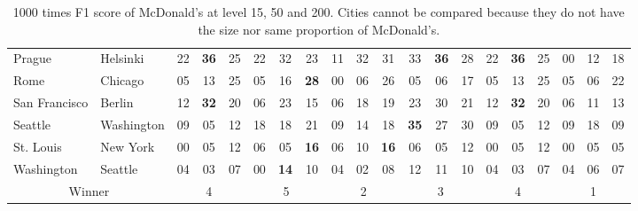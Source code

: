 \documentclass[svgnames,a4paper,final,notitlepage,10pt]{article}
\newcommand{\cbest}[1]{\textbf{#1}}
\newcommand{\notbest}[1]{\textcolor{light-gray}{#1}}
\begin{document}
\begin{table}[ht]
\begin{tabular}{llccc|ccc|ccc|ccc|ccc|ccc}
Prague & Helsinki & \notbest{22} & \cbest{36} & \notbest{25} & \notbest{22} & 32 & \notbest{23} & \notbest{11} & 32 & \notbest{31} & \notbest{33} & \cbest{36} & \notbest{28} & \notbest{22} & \cbest{36} & \notbest{25} & \notbest{00} & \notbest{12} & 18 \\
Rome & Chicago & \notbest{05} & \notbest{13} & 25 & \notbest{05} & \notbest{16} & \cbest{28} & \notbest{00} & \notbest{06} & 26 & \notbest{05} & \notbest{06} & 17 & \notbest{05} & \notbest{13} & 25 & \notbest{05} & \notbest{06} & 22 \\
San Francisco & Berlin & \notbest{12} & \cbest{32} & \notbest{20} & \notbest{06} & 23 & \notbest{15} & \notbest{06} & \notbest{18} & 19 & \notbest{23} & 30 & \notbest{21} & \notbest{12} & \cbest{32} & \notbest{20} & \notbest{06} & \notbest{11} & 13 \\
Seattle & Washington & \notbest{09} & \notbest{05} & 12 & \notbest{18} & \notbest{18} & 21 & \notbest{09} & \notbest{14} & 18 & \cbest{35} & \notbest{27} & \notbest{30} & \notbest{09} & \notbest{05} & 12 & \notbest{09} & 18 & \notbest{09} \\
St. Louis & New York & \notbest{00} & \notbest{05} & 12 & \notbest{06} & \notbest{05} & \cbest{16} & \notbest{06} & \notbest{10} & \cbest{16} & \notbest{06} & \notbest{05} & 12 & \notbest{00} & \notbest{05} & 12 & \notbest{00} & 05 & \notbest{05} \\
Washington & Seattle & \notbest{04} & \notbest{03} & 07 & \notbest{00} & \cbest{14} & \notbest{10} & \notbest{04} & \notbest{02} & 08 & 12 & \notbest{11} & \notbest{10} & \notbest{04} & \notbest{03} & 07 & \notbest{04} & \notbest{06} & 07 \\
\midrule
\multicolumn{2}{c}{Winner} & \multicolumn{3}{c}{4} & \multicolumn{3}{c}{5} &
\multicolumn{3}{c}{2} & \multicolumn{3}{c}{3} &
\multicolumn{3}{c}{4} & \multicolumn{3}{c}{1}\\
\bottomrule
\end{tabular}
\caption[Metric score for brand task]{1000 times F1 score of McDonald's at level 15, 50
and 200. Cities cannot be compared because they do not have the size nor same
proportion of McDonald's.\label{tab:metric_brand}}
\end{table}
\end{document}
